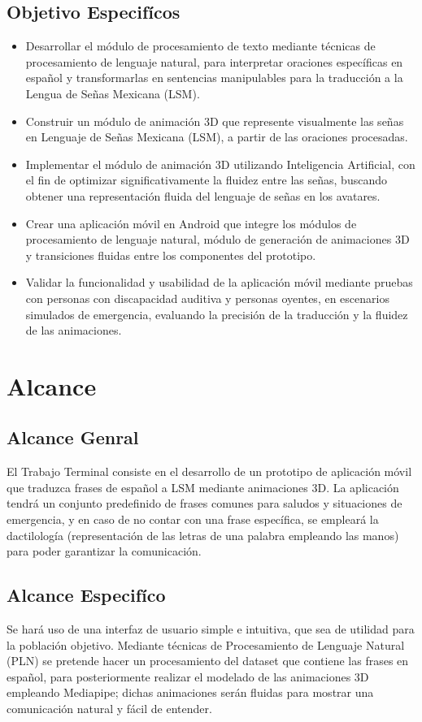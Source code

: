 \subsection{Objetivo Especifícos}
\begin{itemize}
 \item Desarrollar el módulo de procesamiento de texto mediante técnicas de procesamiento de lenguaje natural, para interpretar oraciones específicas en español y transformarlas en sentencias manipulables para la traducción a la Lengua de Señas Mexicana (LSM).
    \item Construir un módulo de animación 3D que represente visualmente las señas en Lenguaje de Señas Mexicana (LSM), a partir de las oraciones procesadas.
    \item Implementar el módulo de animación 3D utilizando Inteligencia Artificial, con el fin de optimizar significativamente la fluidez entre las señas, buscando obtener una representación fluida del lenguaje de señas en los avatares.
    \item Crear una aplicación móvil en Android que integre los módulos de procesamiento de lenguaje natural, módulo de generación de animaciones 3D y transiciones fluidas entre los componentes del prototipo.
    \item Validar la funcionalidad y usabilidad de la aplicación móvil mediante pruebas con personas con discapacidad auditiva y personas oyentes, en escenarios simulados de emergencia, evaluando la precisión de la traducción y la fluidez de las animaciones.
\end{itemize}

\section{Alcance}
\subsection{Alcance Genral}
El Trabajo Terminal consiste en el desarrollo de un prototipo de aplicación móvil que traduzca frases de español a LSM mediante animaciones 3D. La aplicación tendrá un conjunto predefinido de frases comunes para saludos y situaciones de emergencia, y en caso de no contar con una frase específica, se empleará la dactilología (representación de las letras de una palabra empleando las manos) para poder garantizar la comunicación.

\subsection{Alcance Especifíco}
Se hará uso de una interfaz de usuario simple e intuitiva, que sea de utilidad para la población objetivo. Mediante técnicas de Procesamiento de Lenguaje Natural (PLN) se pretende hacer un procesamiento del dataset que contiene las frases en español, para posteriormente realizar el modelado de las animaciones 3D empleando Mediapipe; dichas animaciones serán fluidas para mostrar una comunicación natural y fácil de entender.

